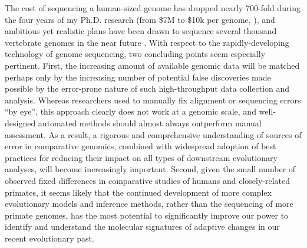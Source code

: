 The cost of sequencing a human-sized genome has dropped nearly
700-fold during the four years of my Ph.D. research (from \$7M to
\$10k per genome, \citep{Wetterstrand2011}), and ambitious yet
realistic plans have been drawn to sequence several thousand
vertebrate genomes in the near future \citep{Haussler2009}. With
respect to the rapidly-developing technology of genome sequencing, two
concluding points seem especially pertinent. First, the increasing
amount of available genomic data will be matched perhaps only by the
increasing number of potential false discoveries made possible by the
error-prone nature of such high-throughput data collection and
analysis. Whereas researchers used to manually fix alignment or
sequencing errors ``by eye'', this approach clearly does not work at a
genomic scale, and well-designed automated methods should almost
always outperform manual assessment. As a result, a rigorous and
comprehensive understanding of sources of error in comparative
genomics, combined with widespread adoption of best practices for
reducing their impact on all types of downstream evolutionary
analyses, will become increasingly important. Second, given the small
number of observed fixed differences in comparative studies of humans
and closely-related primates, it seems likely that the continued
development of more complex evolutionary models and inference methods,
rather than the sequencing of more primate genomes, has the most
potential to significantly improve our power to identify and
understand the molecular signatures of adaptive changes in our recent
evolutionary past.
